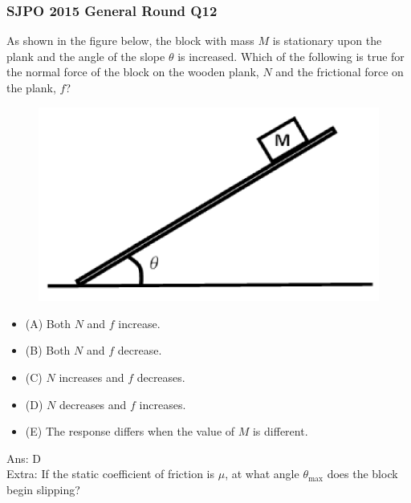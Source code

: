 \documentclass{article}
\begin{document}
\subsubsection{SJPO 2015 General Round Q12}
\label{sec:sjpo2015q12sec_static}
As shown in the figure below, the block with mass $M$ is stationary upon the plank and the angle of the slope $\theta$ is increased. Which of the following is true for the normal force of the block on the wooden plank, $N$ and the frictional force on the plank, $f$? \\
\begin{figure}
\includegraphics[width=1.0\linewidth]{images/sjpo2015q12.png}
\end{figure}


\begin{itemize}
\item[] (A) Both $N$ and $f$ increase.
\item[] (B) Both $N$ and $f$ decrease.
\item[] (C) $N$ increases and $f$ decreases.
\item[] (D) $N$ decreases and $f$ increases.
\item[] (E) The response differs when the value of $M$ is different.
\end{itemize}
Ans: \ifpaper D \fi \\[10pt]
Extra: If the static coefficient of friction is $\mu$, at what angle $\theta_{\text{max}}$ does the block begin slipping?
\end{document}
